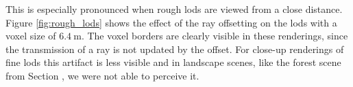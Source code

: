 This is especially pronounced when rough \acsp{lod} are viewed from a close distance.
Figure \ref{fig:rough_lods} shows the effect of the ray offsetting on the \acsp{lod} with a voxel size of $\SI{6.4}{\m}$.
The voxel borders are clearly visible in these renderings, since the transmission of a ray is not updated by the offset.
For close-up renderings of fine \acsp{lod} this artifact is less visible and in landscape scenes, like the forest scene from Section \label{sec:forest_experiments}, we were not able to perceive it.







